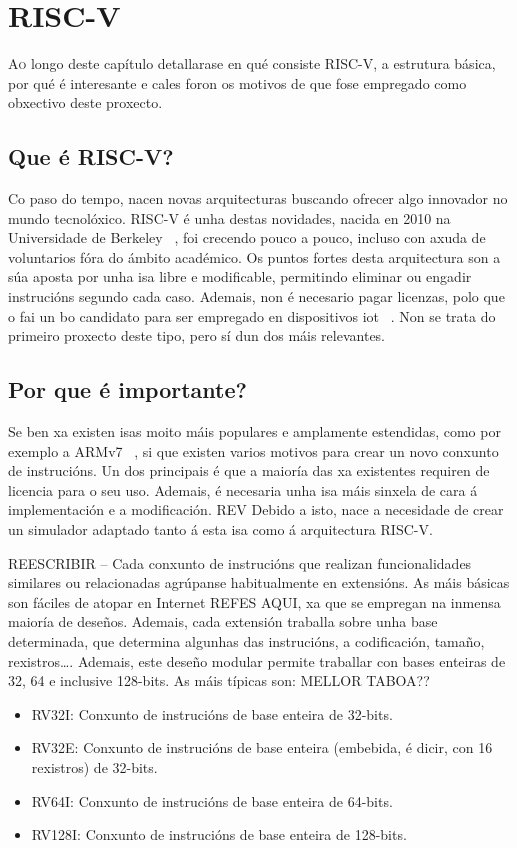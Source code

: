 \chapter{RISC-V}
\label{chap:riscv}

\lettrine{A}{o} longo deste capítulo detallarase en qué consiste RISC-V, a estrutura básica, por qué é interesante e cales foron os motivos de que fose empregado como obxectivo deste proxecto.

\section{Que é RISC-V?}\label{sec:que_riscv}
Co paso do tempo, nacen novas arquitecturas buscando ofrecer algo innovador no mundo tecnolóxico. RISC-V é unha destas novidades, nacida en 2010 na Universidade de Berkeley ~\cite{WikipediaRISCV}, foi crecendo pouco a pouco, incluso con axuda de voluntarios fóra do ámbito académico. Os puntos fortes desta arquitectura son a súa aposta por unha \acrfull{isa} libre e modificable, permitindo eliminar ou engadir instrucións segundo cada caso. Ademais, non é necesario pagar licenzas, polo que o fai un bo candidato para ser empregado en dispositivos \acrfull{iot} ~\cite{RISCV_IoT}. Non se trata do primeiro proxecto deste tipo, pero sí dun dos máis relevantes. 

\section{Por que é importante?}\label{sec:imp_riscv}
Se ben xa existen \acrshort{isa}s moito máis populares e amplamente estendidas, como por exemplo a ARMv7 ~\cite{Waterman:EECS-2016-1}, si que existen varios motivos para crear un novo conxunto de instrucións. Un dos principais é que a maioría das xa existentes requiren de licencia para o seu uso. Ademais, é necesaria unha \acrshort{isa} máis sinxela de cara á implementación e a modificación. REV Debido a isto, nace a necesidade de crear un simulador adaptado tanto á esta \acrshort{isa} como á arquitectura RISC-V.

REESCRIBIR -- Cada conxunto de instrucións que realizan funcionalidades similares ou relacionadas agrúpanse habitualmente en extensións. As máis básicas son fáciles de atopar en Internet REFES AQUI, xa que se empregan na inmensa maioría de deseños. Ademais, cada extensión traballa sobre unha base determinada, que determina algunhas das instrucións, a codificación, tamaño, rexistros\dots. Ademais, este deseño modular permite traballar con bases enteiras de 32, 64 e inclusive 128-bits. As máis típicas son: 
MELLOR TABOA??
\begin{itemize}
    \item RV32I: Conxunto de instrucións de base enteira de 32-bits.
    \item RV32E: Conxunto de instrucións de base enteira (embebida, é dicir, con 16 rexistros) de 32-bits.
    \item RV64I: Conxunto de instrucións de base enteira de 64-bits.
    \item RV128I: Conxunto de instrucións de base enteira de 128-bits.
\end{itemize}

